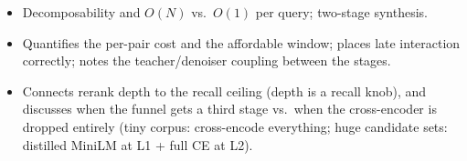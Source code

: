 \begin{interviewq}

\goodgreat
\begin{itemize}
    \item {} Decomposability and $O(N)$ vs.\ $O(1)$ per query; two-stage synthesis.
    \item {} Quantifies the per-pair cost and the affordable window; places late interaction correctly; notes the teacher/denoiser coupling between the stages.
    \item {} Connects rerank depth to the recall ceiling (depth is a recall knob), and discusses when the funnel gets a third stage vs.\ when the cross-encoder is dropped entirely (tiny corpus: cross-encode everything; huge candidate sets: distilled MiniLM at L1 + full CE at L2).
\end{itemize}

\end{interviewq}


